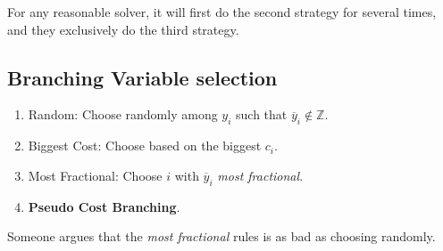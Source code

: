 \begin{remark}
	For any reasonable solver, it will first do the second strategy for several times, and they exclusively do the third strategy.
\end{remark}

\subsection{Branching Variable selection}\label{subsec:branching-variable-selection}
\begin{enumerate}
	\item Random: Choose randomly among \(y_{i}\) such that \(\overline{y}_{i}\notin\mathbb{Z}\).
	\item Biggest Cost: Choose based on the biggest \(c_{i}\).
	\item Most Fractional: Choose \(i\) with \(\overline{y}_{i}\) \emph{most fractional}.
	\item \textbf{Pseudo Cost Branching}.
\end{enumerate}

\begin{note}
	Someone argues that the \emph{most fractional} rules is as bad as choosing randomly.
\end{note}
